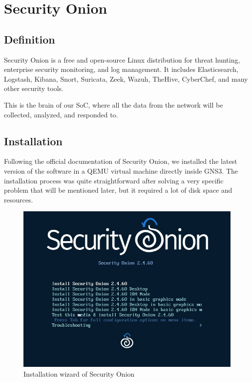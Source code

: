 \section{Security Onion}

\subsection{Definition}
Security Onion is a free and open-source Linux distribution for threat hunting, enterprise security monitoring, and log management.
It includes Elasticsearch, Logstash, Kibana, Snort, Suricata, Zeek, Wazuh, TheHive, CyberChef, and many other security tools.

This is the brain of our SoC, where all the data from the network will be collected, analyzed, and responded to.

\subsection{Installation}
Following the official documentation of Security Onion, we installed the latest version of the software in a QEMU virtual machine directly inside GNS3.
The installation process was quite straightforward after solving a very specific problem that will be mentioned later, but it required a lot of disk space and resources.

\begin{figure}[H]
    \centering
    \includegraphics[width=1\textwidth]{src/assets/images/security-onion-install.jpg}
    \caption{Installation wizard of Security Onion}
\end{figure}

